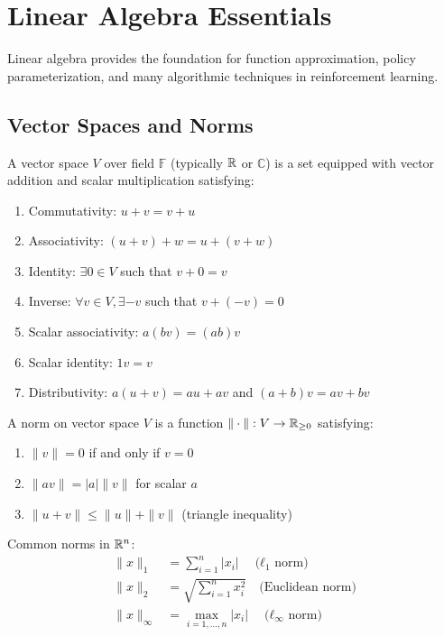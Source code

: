 \section{Linear Algebra Essentials}

Linear algebra provides the foundation for function approximation, policy parameterization, and many algorithmic techniques in reinforcement learning.

\subsection{Vector Spaces and Norms}

\begin{definition}
A vector space $V$ over field $\mathbb{F}$ (typically $\mathbb{R}$ or $\mathbb{C}$) is a set equipped with vector addition and scalar multiplication satisfying:
\begin{enumerate}
    \item Commutativity: $u + v = v + u$
    \item Associativity: $(u + v) + w = u + (v + w)$
    \item Identity: $\exists 0 \in V$ such that $v + 0 = v$
    \item Inverse: $\forall v \in V, \exists -v$ such that $v + (-v) = 0$
    \item Scalar associativity: $a(bv) = (ab)v$
    \item Scalar identity: $1v = v$
    \item Distributivity: $a(u + v) = au + av$ and $(a + b)v = av + bv$
\end{enumerate}
\end{definition}

\begin{definition}[Norm]
A norm on vector space $V$ is a function $\|\cdot\|: V \to \mathbb{R}_{\geq 0}$ satisfying:
\begin{enumerate}
    \item $\|v\| = 0$ if and only if $v = 0$
    \item $\|av\| = |a|\|v\|$ for scalar $a$
    \item $\|u + v\| \leq \|u\| + \|v\|$ (triangle inequality)
\end{enumerate}
\end{definition}

Common norms in $\mathbb{R}^n$:
\begin{align}
\|x\|_1 &= \sum_{i=1}^n |x_i| \quad \text{($\ell_1$ norm)} \\
\|x\|_2 &= \sqrt{\sum_{i=1}^n x_i^2} \quad \text{(Euclidean norm)} \\
\|x\|_\infty &= \max_{i=1,\ldots,n} |x_i| \quad \text{($\ell_\infty$ norm)}
\end{align}

